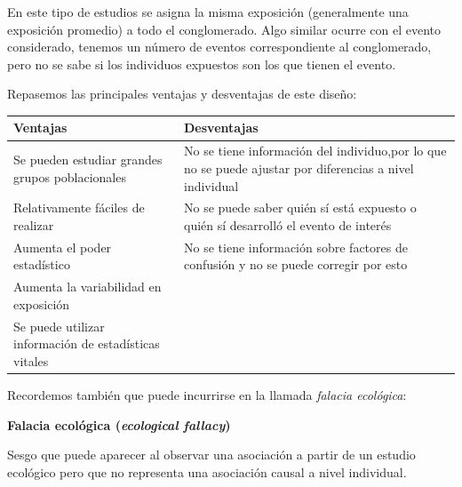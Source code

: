 \documentclass[
  spanish,
  a4paper,
]{scrbook}
\newcounter{none} %
\begin{document}
En este tipo de estudios se asigna la misma exposición (generalmente una
exposición promedio) a todo el conglomerado. Algo similar ocurre con el
evento considerado, tenemos un número de eventos correspondiente al
conglomerado, pero no se sabe si los individuos expuestos son los que
tienen el evento.

Repasemos las principales ventajas y desventajas de este diseño:

{\def\LTcaptype{none} %
\begin{longtable}[]{@{}
  >{\raggedright\arraybackslash}p{}
  >{\raggedright\arraybackslash}p{}@{}}
\toprule\noalign{}
\begin{minipage}[b]{\linewidth}\raggedright
Ventajas
\end{minipage} & \begin{minipage}[b]{\linewidth}\raggedright
Desventajas
\end{minipage} \\
\midrule\noalign{}
\endhead
\bottomrule\noalign{}
\endlastfoot
Se pueden estudiar grandes grupos poblacionales & No se tiene
información del individuo,por lo que no se puede ajustar por diferencias
a nivel individual \\
Relativamente fáciles de realizar & No se puede saber quién sí está
expuesto o quién sí desarrolló el evento de interés \\
Aumenta el poder estadístico & No se tiene información sobre factores de
confusión y no se puede corregir por esto \\
Aumenta la variabilidad en exposición & \\
Se puede utilizar información de estadísticas vitales & \\
\end{longtable}
}

Recordemos también que puede incurrirse en la llamada \emph{falacia
ecológica}:

\begin{tcolorbox}[enhanced jigsaw, arc=.35mm, bottomrule=.15mm, breakable, colback=white, colframe=quarto-callout-warning-color-frame, left=2mm, leftrule=.75mm, opacityback=0, rightrule=.15mm, toprule=.15mm]
\begin{minipage}[t]{5.5mm}
\textcolor{quarto-callout-warning-color}{\faExclamationTriangle}
\end{minipage}%
\begin{minipage}[t]{\textwidth - 5.5mm}

\vspace{-3mm}\textbf{Falacia ecológica (\emph{ecological fallacy})}\vspace{3mm}

Sesgo que puede aparecer al observar una asociación a partir de un
estudio ecológico pero que no representa una asociación causal a nivel
individual.

\end{minipage}%
\end{tcolorbox}
\end{document}
